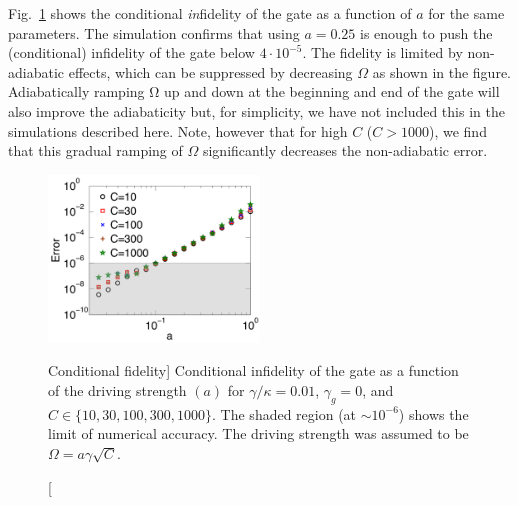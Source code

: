 Fig.~\ref{fig:F} shows the conditional \emph{in}fidelity of the gate as a
function of $a$ for the same parameters. The simulation confirms that using $a =
0.25$ is enough to push the (conditional) infidelity of the gate below
$4\cdot10^{-5}$. The fidelity is limited by non-adiabatic effects, which can be
suppressed by decreasing $\Omega$ as shown in the figure. Adiabatically ramping
Ω up and down at the beginning and end of the gate will also improve the
adiabaticity but, for simplicity, we have not included this in the simulations
described here. Note, however that for high $C$ ($C>1000$), we find that this
gradual ramping of $\Omega$ significantly decreases the non-adiabatic error.
\begin{figure}[h] 
\centering
\includegraphics[width=0.5\textwidth]{./figs_Borregaard_PRL2015/figureSN3} 
\caption
[Conditional fidelity]
{ 
\label{fig:F}
Conditional infidelity of the gate as a function of the driving strength $(a)$
for $\gamma/\kappa = 0.01$, $\gamma_g = 0$, and $C\in\{10,30,100,300,1000\}$.
The shaded region (at $\sim 10^{-6}$) shows the limit of numerical accuracy. The
driving strength was assumed to be $\Omega=a\gamma\sqrt{C}$.}
\end{figure} 


